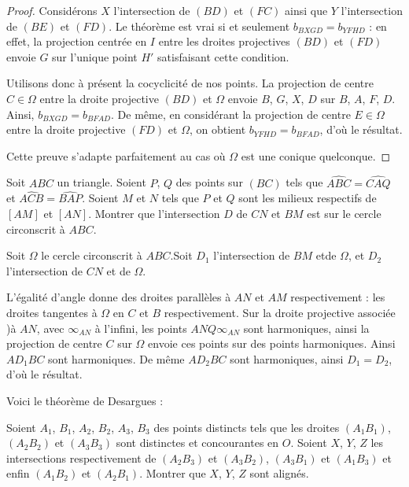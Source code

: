 \begin{proof}
Considérons $X$ l'intersection de $(BD)$ et $(FC)$ ainsi que $Y$ l'intersection de $(BE)$ et $(FD)$. Le théorème est vrai si et seulement $b_{BXGD} = b_{YFHD}$ : en effet, la projection centrée en $I$ entre les droites projectives $(BD)$ et $(FD)$ envoie $G$ sur l'unique point $H'$ satisfaisant cette condition.

\medskip

Utilisons donc à présent la cocyclicité de nos points. La projection de centre $C\in \Omega$ entre la droite projective $(BD)$ et $\Omega$ envoie $B$, $G$, $X$, $D$ sur $B$, $A$, $F$, $D$. Ainsi, $b_{BXGD} = b_{BFAD}$. De même, en considérant la projection de centre $E\in \Omega$ entre la droite projective $(FD)$ et $\Omega$, on obtient $b_{YFHD} = b_{BFAD}$, d'où le résultat.

\medskip

Cette preuve s'adapte parfaitement au cas où $\Omega$ est une conique quelconque.
\end{proof}


\begin{exo}
Soit $ABC$ un triangle. Soient $P$, $Q$ des points sur $(BC)$ tels que $\widehat{ABC} = \widehat{CAQ}$ et $\widehat{ACB} = \widehat{BAP}$. Soient $M$ et $N$ tels que $P$ et $Q$ sont les milieux respectifs de $[AM]$ et $[AN]$. Montrer que l'intersection $D$ de $CN$ et $BM$ est sur le cercle circonscrit à $ABC$.
\end{exo}


\begin{sol}
Soit $\Omega$ le cercle circonscrit à $ABC$.Soit $D_1$ l'intersection de $BM$ etde $\Omega$, et $D_2$ l'intersection de $CN$ et de $\Omega$.

\medskip

L'égalité d'angle donne des droites parallèles à $AN$ et $AM$ respectivement : les droites tangentes à $\Omega$ en $C$ et $B$ respectivement. Sur la droite projective associée )à $AN$, avec $\infty_{AN}$ à l'infini, les points $ANQ\infty_{AN}$ sont harmoniques, ainsi la projection de centre $C$ sur $\Omega$ envoie ces points sur des points harmoniques. Ainsi $AD_1BC$ sont harmoniques. De même $AD_2BC$ sont harmoniques, ainsi $D_1=D_2$, d'où le résultat.
\end{sol}


Voici le théorème de Desargues :

\begin{thm}
Soient $A_1$, $B_1$, $A_2$, $B_2$, $A_3$, $B_3$ des points distincts tels que les droites $(A_1B_1)$, $(A_2B_2)$ et $(A_3B_3)$ sont distinctes et concourantes en $O$. Soient $X$, $Y$, $Z$ les intersections respectivement de $(A_2B_3)$ et $(A_3B_2)$, $(A_3B_1)$ et $(A_1B_3)$ et enfin $(A_1B_2)$ et $(A_2B_1)$. Montrer que $X$, $Y$, $Z$ sont alignés.
\end{thm}

